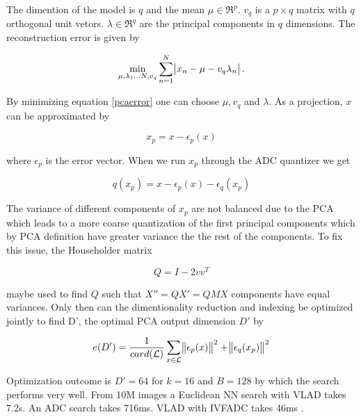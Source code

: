 \documentclass[english,12pt,a4paper,pdftex,elec,utf8]{aaltothesis}
\begin{document}
The dimention of the model is $q$ and the mean $\mu \in \Re^p$. $v_q$ is a $p \times q$ matrix with $q$ orthogonal unit vetors. $\lambda \in \Re^q$ are the principal components in $q$ dimensions. The reconstruction error is given by

\begin{equation}\label{pcaerror}
\min_{\mu,\lambda_1\ldots N, v_q}\sum_{n=1}^N \abs{x_n-\mu - v_q\lambda_n}.
\end{equation}

By minimizing equation \ref{pcaerror} one can choose $\mu, v_q$ and $\lambda$. \cite{Blei2008} As a projection, $x$ can be approximated by

\begin{equation}\label{vladpca}
x_p = x -\epsilon_p(x)
\end{equation}

where $\epsilon_p$ is the error vector. \cite{Jegou2014} When we run $x_p$ through the ADC quantizer we get

\begin{equation}\label{vladpcaquant}
  q(x_p) = x - \epsilon_p(x) - \epsilon_q(x_p)
\end{equation}

The variance of different components of $x_p$ are not balanced due to the PCA \cite{Jegou2014} which leads to a more coarse quantization of the first principal components which by PCA definition have greater variance the the rest of the components. To fix this issue, the Householder matrix

\begin{equation}\label{householder}
Q = I - 2vv^T
\end{equation}

maybe used to find $Q$ such that $X'' = QX' = QMX$ components have equal variances.\cite{Jegou2014} Only then can the dimentionality reduction and indexing be optimized jointly to find D', the optimal PCA output dimension $D'$ by

\begin{equation}\label{jointoptimization}
e(D') = \frac{1}{card(\mathcal{L})}\sum_{x\in \mathcal{L}}\norm{\epsilon_p(x)}^2 + \norm{\epsilon_q(x_p)}^2
\end{equation}

Optimization outcome is $D'=64$ for $k=16$ and $B=128$ by which the search performs very well. From 10M images a Euclidean NN search with VLAD takes 7.2s. An ADC search takes 716ms. VLAD with IVFADC takes 46ms \cite{Jegou2014}.
\end{document}

